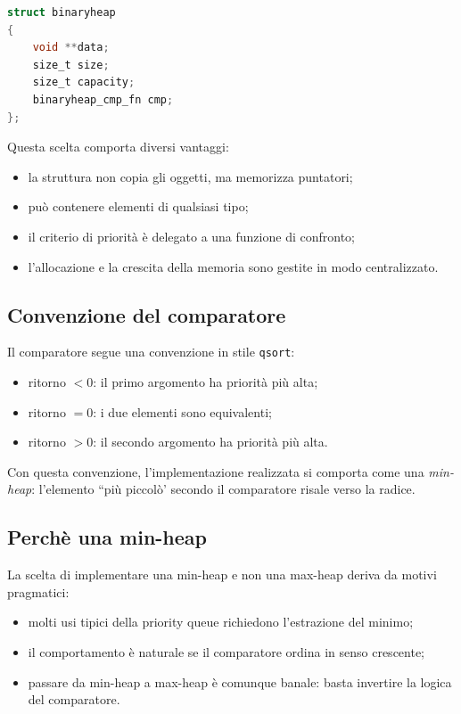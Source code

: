 \documentclass[a4paper,12pt]{article}
\begin{document}
\begin{lstlisting}[language=C]
struct binaryheap
{
    void **data;
    size_t size;
    size_t capacity;
    binaryheap_cmp_fn cmp;
};
\end{lstlisting}

Questa scelta comporta diversi vantaggi:

\begin{itemize}[leftmargin=*]
    \item la struttura non copia gli oggetti, ma memorizza puntatori;
    \item può contenere elementi di qualsiasi tipo;
    \item il criterio di priorità è delegato a una funzione di confronto;
    \item l'allocazione e la crescita della memoria sono gestite in modo centralizzato.
\end{itemize}

\subsection{Convenzione del comparatore}

Il comparatore segue una convenzione in stile \texttt{qsort}:

\begin{itemize}[leftmargin=*]
    \item ritorno \(< 0\): il primo argomento ha priorità più alta;
    \item ritorno \(= 0\): i due elementi sono equivalenti;
    \item ritorno \(> 0\): il secondo argomento ha priorità più alta.
\end{itemize}

Con questa convenzione, l'implementazione realizzata si comporta come una \emph{min-heap}: l'elemento ``più piccolò' secondo il comparatore risale verso la radice.

\subsection{Perchè una min-heap}

La scelta di implementare una min-heap e non una max-heap deriva da motivi pragmatici:

\begin{itemize}[leftmargin=*]
    \item molti usi tipici della priority queue richiedono l'estrazione del minimo;
    \item il comportamento è naturale se il comparatore ordina in senso crescente;
    \item passare da min-heap a max-heap è comunque banale: basta invertire la logica del comparatore.
\end{itemize}
\end{document}
